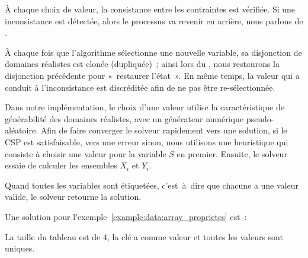À chaque choix de valeur, la consistance entre les contraintes est vérifiée. Si
une inconsistance est détectée, alors le processus va revenir en arrière, nous
parlons de .

À chaque fois que l'algorithme sélectionne une nouvelle variable, sa disjonction
de domaines réalistes est clonée (dupliquée)~; ainsi lors du
, nous restaurons la disjonction précédente pour
«~restaurer l'état~». En même temps, la valeur qui a conduit à l'inconsistance
est discréditée afin de ne pas être re-sélectionnée.

Dans notre implémentation, le choix d'une valeur utilise la caractéristique de
générabilité des domaines réalistes, avec un générateur numérique
pseudo-aléatoire. Afin de faire converger le solveur rapidement vers une
solution, si le CSP est satisfaisable, vers une erreur sinon, nous utilisons une
heuristique qui consiste à choisir une valeur pour la variable $S$ en premier.
Ensuite, le solveur essaie de calculer les ensembles $X_i$ et $Y_i$.

Quand toutes les variables sont étiquetées, c'est~à~dire que chacune a une
valeur valide, le solveur retourne la solution.

\begin{example}

Une solution pour l'exemple~\ref{example:data:array_proprietes} est~:
%
\begin{pre}
[ \\
    0 => 'c', \\
    1 => 'd', \\
    2 => 'a', \\
    3 => 'e' \\
]
\end{pre}
%
La taille du tableau est de 4, la clé  a comme valeur  et
toutes les valeurs sont uniques.

\end{example}
